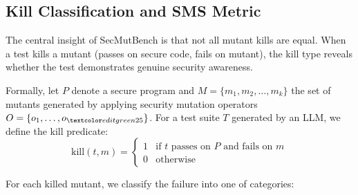 \documentclass[sigconf,anonymous,review]{acmart}
\begin{document}
\subsection{Kill Classification and SMS Metric}

The central insight of SecMutBench is that not all mutant kills are equal. When a test kills a mutant (passes on secure code, fails on mutant), the kill type reveals whether the test demonstrates genuine security awareness.

Formally, let $P$ denote a secure program and $M = \{m_1, m_2, \ldots, m_k\}$ the set of mutants generated by applying security mutation operators $O = \{o_1, \ldots, o_{\fix{25}}\}$. For a test suite $T$ generated by an LLM, we define the kill predicate:
\begin{equation}
    \text{kill}(t, m) = \begin{cases} 1 & \text{if } t \text{ passes on } P \text{ and fails on } m \\ 0 & \text{otherwise} \end{cases}
\end{equation}

\noindent For each killed mutant, we classify the failure into one of  categories:
\end{document}
